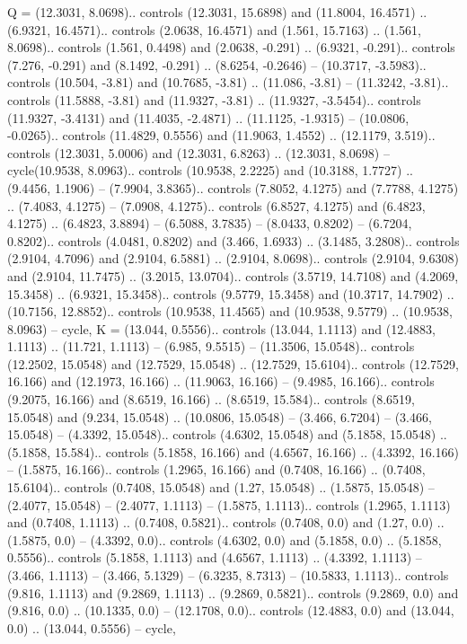 {Q} = {(12.3031, 8.0698).. controls (12.3031, 15.6898) and (11.8004, 16.4571) .. (6.9321, 16.4571).. controls (2.0638, 16.4571) and (1.561, 15.7163) .. (1.561, 8.0698).. controls (1.561, 0.4498) and (2.0638, -0.291) .. (6.9321, -0.291).. controls (7.276, -0.291) and (8.1492, -0.291) .. (8.6254, -0.2646) -- (10.3717, -3.5983).. controls (10.504, -3.81) and (10.7685, -3.81) .. (11.086, -3.81) -- (11.3242, -3.81).. controls (11.5888, -3.81) and (11.9327, -3.81) .. (11.9327, -3.5454).. controls (11.9327, -3.4131) and (11.4035, -2.4871) .. (11.1125, -1.9315) -- (10.0806, -0.0265).. controls (11.4829, 0.5556) and (11.9063, 1.4552) .. (12.1179, 3.519).. controls (12.3031, 5.0006) and (12.3031, 6.8263) .. (12.3031, 8.0698) -- cycle(10.9538, 8.0963).. controls (10.9538, 2.2225) and (10.3188, 1.7727) .. (9.4456, 1.1906) -- (7.9904, 3.8365).. controls (7.8052, 4.1275) and (7.7788, 4.1275) .. (7.4083, 4.1275) -- (7.0908, 4.1275).. controls (6.8527, 4.1275) and (6.4823, 4.1275) .. (6.4823, 3.8894) -- (6.5088, 3.7835) -- (8.0433, 0.8202) -- (6.7204, 0.8202).. controls (4.0481, 0.8202) and (3.466, 1.6933) .. (3.1485, 3.2808).. controls (2.9104, 4.7096) and (2.9104, 6.5881) .. (2.9104, 8.0698).. controls (2.9104, 9.6308) and (2.9104, 11.7475) .. (3.2015, 13.0704).. controls (3.5719, 14.7108) and (4.2069, 15.3458) .. (6.9321, 15.3458).. controls (9.5779, 15.3458) and (10.3717, 14.7902) .. (10.7156, 12.8852).. controls (10.9538, 11.4565) and (10.9538, 9.5779) .. (10.9538, 8.0963) -- cycle},
{K} = {(13.044, 0.5556).. controls (13.044, 1.1113) and (12.4883, 1.1113) .. (11.721, 1.1113) -- (6.985, 9.5515) -- (11.3506, 15.0548).. controls (12.2502, 15.0548) and (12.7529, 15.0548) .. (12.7529, 15.6104).. controls (12.7529, 16.166) and (12.1973, 16.166) .. (11.9063, 16.166) -- (9.4985, 16.166).. controls (9.2075, 16.166) and (8.6519, 16.166) .. (8.6519, 15.584).. controls (8.6519, 15.0548) and (9.234, 15.0548) .. (10.0806, 15.0548) -- (3.466, 6.7204) -- (3.466, 15.0548) -- (4.3392, 15.0548).. controls (4.6302, 15.0548) and (5.1858, 15.0548) .. (5.1858, 15.584).. controls (5.1858, 16.166) and (4.6567, 16.166) .. (4.3392, 16.166) -- (1.5875, 16.166).. controls (1.2965, 16.166) and (0.7408, 16.166) .. (0.7408, 15.6104).. controls (0.7408, 15.0548) and (1.27, 15.0548) .. (1.5875, 15.0548) -- (2.4077, 15.0548) -- (2.4077, 1.1113) -- (1.5875, 1.1113).. controls (1.2965, 1.1113) and (0.7408, 1.1113) .. (0.7408, 0.5821).. controls (0.7408, 0.0) and (1.27, 0.0) .. (1.5875, 0.0) -- (4.3392, 0.0).. controls (4.6302, 0.0) and (5.1858, 0.0) .. (5.1858, 0.5556).. controls (5.1858, 1.1113) and (4.6567, 1.1113) .. (4.3392, 1.1113) -- (3.466, 1.1113) -- (3.466, 5.1329) -- (6.3235, 8.7313) -- (10.5833, 1.1113).. controls (9.816, 1.1113) and (9.2869, 1.1113) .. (9.2869, 0.5821).. controls (9.2869, 0.0) and (9.816, 0.0) .. (10.1335, 0.0) -- (12.1708, 0.0).. controls (12.4883, 0.0) and (13.044, 0.0) .. (13.044, 0.5556) -- cycle},
